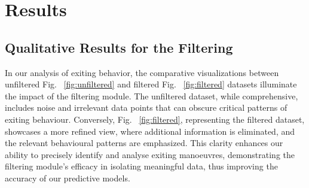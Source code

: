 \section{Results}

\subsection{Qualitative Results for the Filtering}
In our analysis of exiting behavior, the comparative visualizations between unfiltered Fig. ~\ref{fig:unfiltered} and filtered Fig. ~\ref{fig:filtered} datasets illuminate the impact of the filtering module. The unfiltered dataset, while comprehensive, includes noise and irrelevant data points that can obscure critical patterns of exiting behaviour. Conversely, Fig. ~\ref{fig:filtered}, representing the filtered dataset, showcases a more refined view, where additional information is eliminated, and the relevant behavioural patterns are emphasized. This clarity enhances our ability to precisely identify and analyse exiting manoeuvres, demonstrating the filtering module's efficacy in isolating meaningful data, thus improving the accuracy of our predictive models.

